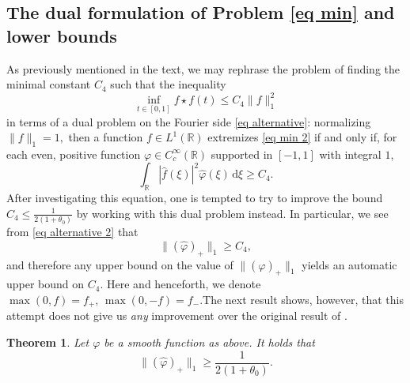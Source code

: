 \documentclass[11pt, reqno]{amsart}
\newcommand{\mmd}{ \mathrm{d}}
\newcommand{\s}{\star}
\numberwithin{equation}{section}
\newtheorem{theorem}{Theorem}[section]
\newcommand{\R}{{\mathbb R}}
\begin{document}
\subsection{The dual formulation of Problem \eqref{eq min} and lower bounds} As previously mentioned in the text, we may rephrase the problem of finding the minimal constant $C_4$ such that the inequality 
\begin{equation}\label{eq min 2}
\inf_{t \in [0,1]} f \s f(t) \le C_4 \|f\|_1^2
\end{equation}
in terms of a dual problem on the Fourier side \eqref{eq alternative}: normalizing $\|f\|_1 = 1,$ then a function $f \in L^1(\R)$ extremizes \eqref{eq min 2} if and only if, for each even, positive
function $\varphi \in C^{\infty}_c(\R)$ supported in $[-1,1]$ with integral $1$, 
\begin{equation}\label{eq alternative 2} 
\int_{\R} |\widehat{f}(\xi)|^2 \widehat{\varphi}(\xi) \, \mmd \xi \ge C_4. 
\end{equation}
After investigating this equation, one is tempted to try to improve the bound $C_4 \le \frac{1}{2(1+\theta_0)}$ by working with this dual problem instead. In particular, we see from \eqref{eq alternative 2} 
that 
\[
\|(\widehat{\varphi})_+\|_1 \ge C_4,
\]
and therefore any upper bound on the value of $\|(\widehat{\varphi})_+\|_1$ yields an automatic upper bound on $C_4.$ Here and henceforth, we denote $\max(0,f) = f_+, \, \max(0,-f) = f_-.$The next result shows, however, that this attempt does not give us \emph{any} improvement 
over the original result of \cite{BarnardSteinerberger}. 

\begin{theorem}\label{thm lower} Let $\varphi$ be a smooth function as above. It holds that 
\[
\|(\widehat{\varphi})_+\|_1 \ge \frac{1}{2(1+\theta_0)}.
\]
\end{theorem}
\end{document}
